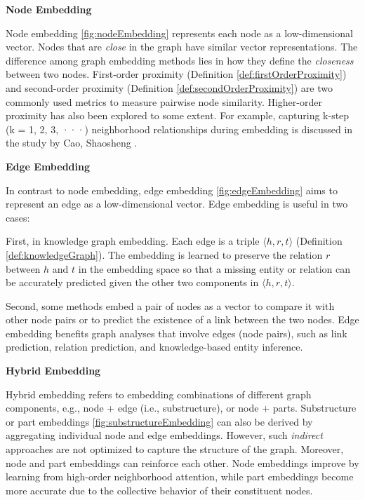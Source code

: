 \textbf{Node Embedding}
\label{sec:nodeEmbedding}



Node embedding \autoref{fig:nodeEmbedding} represents each node as a low-dimensional vector. Nodes that are \textit{close} in the graph have similar vector representations. The difference among graph embedding methods lies in how they define the \textit{closeness} between two nodes. First-order proximity (Definition \ref{def:firstOrderProximity}) and second-order proximity (Definition \ref{def:secondOrderProximity}) are two commonly used metrics to measure pairwise node similarity. Higher-order proximity has also been explored to some extent. For example, capturing k-step (k = 1, 2, 3, ···) neighborhood relationships during embedding is discussed in the study by Cao, Shaosheng \cite{cao2015grarep}.

\textbf{Edge Embedding}
\label{sec:edgeEmbedding}

In contrast to node embedding, edge embedding \autoref{fig:edgeEmbedding} aims to represent an edge as a low-dimensional vector. Edge embedding is useful in two cases:

First, in knowledge graph embedding. Each edge is a triple $\langle h, r, t \rangle$ (Definition \ref{def:knowledgeGraph}). The embedding is learned to preserve the relation $r$ between $h$ and $t$ in the embedding space so that a missing entity or relation can be accurately predicted given the other two components in $\langle h, r, t \rangle$.

Second, some methods embed a pair of nodes as a vector to compare it with other node pairs or to predict the existence of a link between the two nodes. Edge embedding benefits graph analyses that involve edges (node pairs), such as link prediction, relation prediction, and knowledge-based entity inference.

\textbf{Hybrid Embedding}



Hybrid embedding refers to embedding combinations of different graph components, e.g., node + edge (i.e., substructure), or node + parts. Substructure or part embeddings \autoref{fig:substructureEmbedding} can also be derived by aggregating individual node and edge embeddings. However, such \textit{indirect} approaches are not optimized to capture the structure of the graph. Moreover, node and part embeddings can reinforce each other. Node embeddings improve by learning from high-order neighborhood attention, while part embeddings become more accurate due to the collective behavior of their constituent nodes.


